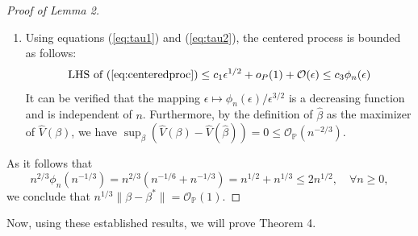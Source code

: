 \documentclass{article}
\newcommand{\wh}{\widehat}
\newcommand{\pr}{\mathbb{P}}
\begin{document}
\begin{proof}[Proof of Lemma 2]
\begin{enumerate}
		\item[(iv)]
		Using equations (\ref{eq:tau1}) and (\ref{eq:tau2}), the centered process is bounded as follows:
		\begin{align}
			\text{LHS of }(\ref{eq:centeredproc}) \le c_1\epsilon^{1/2} + o_P(1) + \mathcal O(\epsilon) \le c_3 \phi_n(\epsilon)
			 \label{eq:phi_n}
		\end{align}
		It can be verified that the mapping $\epsilon \mapsto \phi_n(\epsilon) / \epsilon^{3/2}$ is a decreasing function and is independent of $n$. Furthermore, by the definition of $\hat\beta$ as the maximizer of $\wh V(\beta)$, we have $\sup_\beta (\wh V(\beta) - \wh V(\hat \beta)) = 0 \le \mathcal O_{\pr}(n^{-2/3})$.
	\end{enumerate}
	
	As it follows that
	\[ 
	n^{2/3} \phi_n(n^{-1/3}) = n^{2/3} (n^{-1/6} + n^{-1/3}) = n^{1/2} + n^{1/3} \le 2 n^{1/2}, \quad \forall n\ge0,
	\]	we conclude that $n^{1/3}\|\beta-\beta^*\| = \mathcal O_{\pr}(1).$
\end{proof}

Now, using these established results, we will prove Theorem 4.
\end{document}
